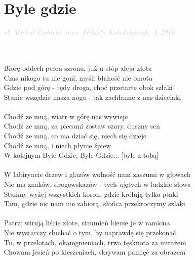 \documentclass[a5paper, 10pt]{book}
\begin{document}
\section{Byle gdzie}\textcolor{lightgray}{\textit{sł. Michał Żłobicki, muz. Elżbieta Kołodziejczyk, X 2016}}\\~\\
\begin{minipage}[t]{0.8\textwidth}
~\\
Biorę oddech pełen szronu, już u stóp aleja złota		\\
Czas nikogo tu nie goni, myśli błahość nie omota		\\
Gdzie pod górę - tędy droga, choć przetarte obok szlaki\\
Stanie wszędzie nasza noga - tak zachłanne z nas dzieciaki\\
\\
\hspace*{5mm}Chodź ze mną, wiatr w górę nas wywieje			\\
\hspace*{5mm}Chodź ze mną, za plecami zostaw szary, duszny sen\\
\hspace*{5mm}Chodź ze mną, co ma dziać się, niech się dzieje		\\
\hspace*{5mm}Chodź ze mną, i niech płynie śpiew			\\
\hspace*{5mm}W kolejnym Byle Gdzie, Byle Gdzie... [byle z tobą]\\
\\
W labiryncie drzew i głazów wolność nam zaszumi w głowach\\
Nie ma znaków, drogowskazów - tych ujętych w ludzkie słowa\\
Stańmy wyżej wszystkich koron, gdzie królują tylko ptaki\\
Tam, gdzie nic nam nie zabiorą, słońca przekroczymy szlaki\\
\\
Patrz: wirują liście złote, strumień bierze je w ramiona\\
Nie wystarczy słuchać o tym, by naprawdę się przekonać\\
Tu, w przelotach, okamgnieniach, trwa tęsknota za mirażem\\
Chowam jesień po kieszeniach, skrywam pamięć za obrazem\\
\end{minipage}
\end{document}
